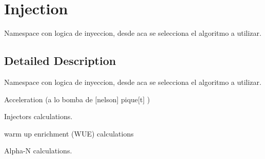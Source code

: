 \hypertarget{group__Injection}{}\section{Injection}
\label{group__Injection}


Namespace con logica de inyeccion, desde aca se selecciona el algoritmo a utilizar.  




\subsection{Detailed Description}
Namespace con logica de inyeccion, desde aca se selecciona el algoritmo a utilizar. 

Acceleration (a lo bomba de \mbox{[}nelson\mbox{]} pique\mbox{[}t\mbox{]} )

Injectors calculations.

warm up enrichment (W\+UE) calculations

Alpha-\/N calculations.